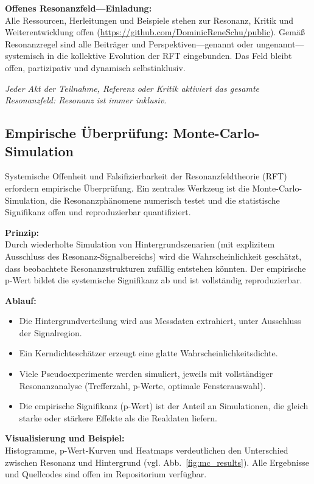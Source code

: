 \documentclass[12pt]{article}
\begin{document}
\medskip

\textbf{Offenes Resonanzfeld—Einladung:}\\
Alle Ressourcen, Herleitungen und Beispiele stehen zur Resonanz, Kritik und Weiterentwicklung offen (\url{https://github.com/DominicReneSchu/public}). Gemäß Resonanzregel sind alle Beiträger und Perspektiven—genannt oder ungenannt—systemisch in die kollektive Evolution der RFT eingebunden. Das Feld bleibt offen, partizipativ und dynamisch selbstinklusiv.

\medskip

\textit{Jeder Akt der Teilnahme, Referenz oder Kritik aktiviert das gesamte Resonanzfeld: Resonanz ist immer inklusiv.}

\subsection{Empirische Überprüfung: Monte-Carlo-Simulation}
\label{sec:monte_carlo}

Systemische Offenheit und Falsifizierbarkeit der Resonanzfeldtheorie (RFT) erfordern empirische Überprüfung. Ein zentrales Werkzeug ist die Monte-Carlo-Simulation, die Resonanzphänomene numerisch testet und die statistische Signifikanz offen und reproduzierbar quantifiziert.

\textbf{Prinzip:}\\
Durch wiederholte Simulation von Hintergrundszenarien (mit explizitem Ausschluss des Resonanz-Signalbereichs) wird die Wahrscheinlichkeit geschätzt, dass beobachtete Resonanzstrukturen zufällig entstehen könnten. Der empirische p-Wert bildet die systemische Signifikanz ab und ist vollständig reproduzierbar.

\textbf{Ablauf:}
\begin{itemize}
	\item Die Hintergrundverteilung wird aus Messdaten extrahiert, unter Ausschluss der Signalregion.
	\item Ein Kerndichteschätzer erzeugt eine glatte Wahrscheinlichkeitsdichte.
	\item Viele Pseudoexperimente werden simuliert, jeweils mit vollständiger Resonanzanalyse (Trefferzahl, p-Werte, optimale Fensterauswahl).
	\item Die empirische Signifikanz (p-Wert) ist der Anteil an Simulationen, die gleich starke oder stärkere Effekte als die Realdaten liefern.
\end{itemize}

\textbf{Visualisierung und Beispiel:}\\
Histogramme, p-Wert-Kurven und Heatmaps verdeutlichen den Unterschied zwischen Resonanz und Hintergrund (vgl. Abb.~\ref{fig:mc_results}). Alle Ergebnisse und Quellcodes sind offen im Repositorium verfügbar.
\end{document}
